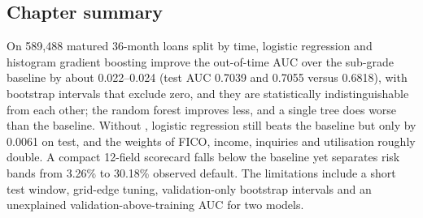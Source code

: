 \subsection{Chapter summary}

On 589,488 matured 36-month loans split by time, logistic regression and histogram gradient boosting improve the out-of-time AUC over the sub-grade baseline by about 0.022--0.024 (test AUC 0.7039 and 0.7055 versus 0.6818), with bootstrap intervals that exclude zero, and they are statistically indistinguishable from each other; the random forest improves less, and a single tree does worse than the baseline. Without , logistic regression still beats the baseline but only by 0.0061 on test, and the weights of FICO, income, inquiries and utilisation roughly double. A compact 12-field scorecard falls below the baseline yet separates risk bands from 3.26\% to 30.18\% observed default. The limitations include a short test window, grid-edge tuning, validation-only bootstrap intervals and an unexplained validation-above-training AUC for two models.
